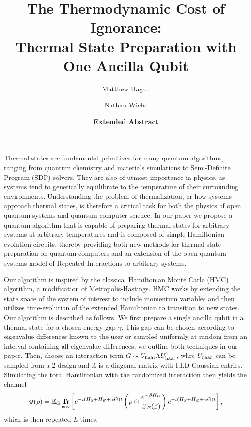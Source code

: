 \documentclass[11pt]{article}
\newcommand{\brackets}[1]{\left[ #1 \right]}
\newcommand{\bigotilde}[1]{\widetilde{O} \left( #1 \right)}
\DeclareMathOperator{\Tr}{Tr}
\newcommand{\partrace}[2]{\Tr_{#1} \brackets{ #2 }}
\newcommand{\partfun}{\mathcal{Z}}
\begin{document}
\title{The Thermodynamic Cost of Ignorance:\\ Thermal State Preparation with One Ancilla Qubit}

\author[1]{Matthew Hagan}
\author[1]{Nathan Wiebe}

\date{\textbf{Extended Abstract}}
\maketitle
Thermal states are fundamental primitives for many quantum algorithms, ranging from quantum chemistry and materials simulations to Semi-Definite Program (SDP) solvers. They are also of utmost importance in physics, as systems tend to generically equilibrate to the temperature of their surrounding environments. Understanding the problem of thermalization, or how systems approach thermal states, is therefore a critical task for both the physics of open quantum systems and quantum computer science. In our paper we propose a quantum algorithm that is capable of preparing thermal states for arbitrary systems at arbitrary temperatures and is composed of simple Hamiltonian evolution circuits, thereby providing both new methods for thermal state preparation on quantum computers and an extension of the open quantum systems model of Repeated Interactions to arbitrary systems. 


Our algorithm is inspired by the classical Hamiltonian Monte Carlo (HMC) algorithm, a modification of Metropolis-Hastings. HMC works by extending the state space of the system of interest to include momentum variables and then utilizes time-evolution of the extended Hamiltonian to transition to new states. Our algorithm is described as follows. We first prepare a single ancilla qubit in a thermal state for a chosen energy gap $\gamma$. This gap can be chosen according to eigenvalue differences known to the user or sampled uniformly at random from an interval containing all eigenvalue differences, we outline both techniques in our paper. Then, choose an interaction term $G \sim U_{\rm haar} \Lambda U_{\rm haar}^\dagger$, whre $U_{\rm haar}$ can be sampled from a 2-design and $\Lambda$ is a diagonal matrix with I.I.D Gaussian entries. Simulating the total Hamiltonian with the randomized interaction then yields the channel
\begin{equation}
    \Phi(\rho) = \mathbb{E}_G \partrace{\rm env}{e^{-i(H_S + H_E + \alpha G) t} \left( \rho \otimes \frac{e^{-\beta H_E}}{\partfun_E(\beta)} \right) e^{+i(H_S + H_E + \alpha G) t} }, \label{eq:phi}
\end{equation}
which is then repeated $L$ times.
\end{document}
